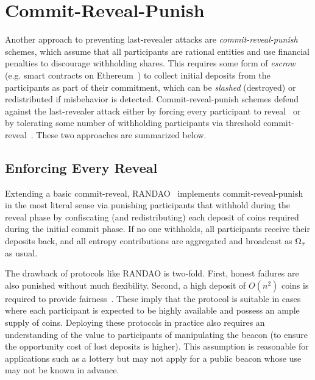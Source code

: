 
\section{Commit-Reveal-Punish}
\label{section:commit-reveal-punish}
Another approach to preventing last-revealer attacks are \textit{commit-reveal-punish} schemes, which assume that all participants are rational entities and use financial penalties to discourage withholding shares. This requires some form of \textit{escrow} (e.g. smart contracts on Ethereum~\cite{wood2014ethereum}) to collect initial deposits from the participants as part of their commitment, which can be \emph{slashed} (destroyed) or redistributed if misbehavior is detected. Commit-reveal-punish schemes defend against the last-revealer attack either by forcing every participant to reveal~\cite{youcai2017randao, andrychowicz2014secure, bentov2014use} or by tolerating some number of withholding participants via threshold commit-reveal~\cite{david2020economically}. These two approaches are summarized below.

\subsection{Enforcing Every Reveal}
Extending a basic commit-reveal, RANDAO~\cite{youcai2017randao} implements commit-reveal-punish in the most literal sense via punishing participants that withhold during the reveal phase by confiscating (and redistributing) each deposit of coins required during the initial commit phase. If no one withholds, all participants receive their deposits back, and all entropy contributions are aggregated and broadcast as $\Omega_\tau$ as usual.

The drawback of protocols like RANDAO is two-fold. First, honest failures are also punished without much flexibility. Second, a high deposit of $O(n^2)$ coins is required to provide fairness~\cite{andrychowicz2014secure,bentov2014use}. These imply that the protocol is suitable in cases where each participant is expected to be highly available and possess an ample supply of coins.
Deploying these protocols in practice also requires an understanding of the value to participants of manipulating the beacon (to ensure the opportunity cost of lost deposits is higher). This assumption is reasonable for applications such as a lottery but may not apply for a public beacon whose use may not be known in advance.


